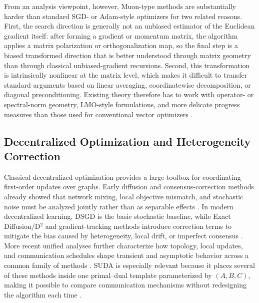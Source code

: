 \documentclass{article}
\begin{document}
From an analysis viewpoint, however, Muon-type methods are substantially harder than standard SGD- or Adam-style optimizers for two related reasons. First, the search direction is generally not an unbiased estimator of the Euclidean gradient itself: after forming a gradient or momentum matrix, the algorithm applies a matrix polarization or orthogonalization map, so the final step is a biased transformed direction that is better understood through matrix geometry than through classical unbiased-gradient recursions. Second, this transformation is intrinsically nonlinear at the matrix level, which makes it difficult to transfer standard arguments based on linear averaging, coordinatewise decomposition, or diagonal preconditioning. Existing theory therefore has to work with operator- or spectral-norm geometry, LMO-style formulations, and more delicate progress measures than those used for conventional vector optimizers \citep{jordan2024muon,pethick2025training,riabinin2025gluon,shen2025convergence}. 


\subsection{Decentralized Optimization and Heterogeneity Correction}


Classical decentralized optimization provides a large toolbox for coordinating first-order updates over graphs. Early diffusion and consensus-correction methods already showed that network mixing, local objective mismatch, and stochastic noise must be analyzed jointly rather than as separable effects \citep{chen2012diffusion,shi2015extra}. In modern decentralized learning, DSGD is the basic stochastic baseline, while Exact Diffusion/D$^2$ and gradient-tracking methods introduce correction terms to mitigate the bias caused by heterogeneity, local drift, or imperfect consensus \citep{lian2017can,tang2018d,pu2021distributed,yuan2023removing}. More recent unified analyses further characterize how topology, local updates, and communication schedules shape transient and asymptotic behavior across a common family of methods \citep{koloskova2020unified,alghunaim2022unified,zhu2024sparkle,kong2025decentralized}. SUDA is especially relevant because it places several of these methods inside one primal--dual template parameterized by $(A,B,C)$, making it possible to compare communication mechanisms without redesigning the algorithm each time \citep{alghunaim2022unified,zhu2024sparkle,kong2025decentralized}.
\end{document}
